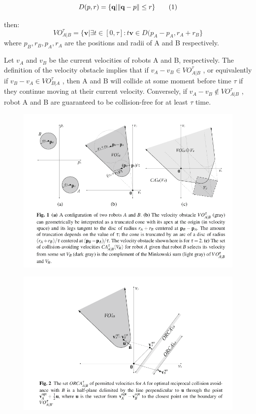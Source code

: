 \documentclass[12pt]{report}
\begin{document}
\begin{equation}
D(p,r) = \{\textbf{q}| \norm{\textbf{q}-p} \leq r\}\tag{1}
\end{equation}

then:
\begin{equation}
VO^{\tau}_{A|B} = \{\textbf{v}|\exists t \in [0,\tau]: t\textbf{v} \in D(p_{A}-p_{A}, r_{A}+r_{B}\} \tag{2}
\end{equation}
where $p_{B}, r_{B}, p_{A}, r_{A}$ are the positions and radii of A and B respectively.


Let $v_{A}$ and $v_{B}$ be the current velocities of robots A and B, respectively. The 
definition of the velocity obstacle implies that if $v_{A} - v_{B} \in VO^{\tau}_{A|B}$ , or equivalently if $v_{B} - v_{A} \in VO^{\tau}_{B|A}$ , then A and B will collide at some moment before time $\tau$ if they continue moving at their current velocity. Conversely, if $v_{A} - v_{B} \notin VO^{\tau}_{A|B}$ , robot A and B are guaranteed to be collision-free for at least $\tau$ time. 

\renewcommand{\thefigure}{1}
\begin{figure}[h]
	\centering
	\includegraphics[scale=0.6]{VO.png}  \label{fig:VO}
\end{figure}

\renewcommand{\thefigure}{2}
\begin{figure}[h]
	\centering
	\includegraphics[scale=0.6]{ORCA.png}  \label{fig:ORCA}
\end{figure}
\end{document}
